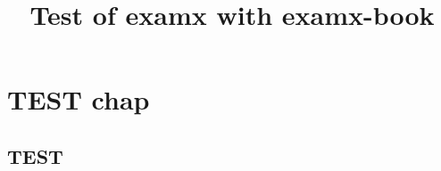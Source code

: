 \documentclass{examx}
\title{Test of examx with examx-book}
\begin{document}
    \examcover
    \tableofcontents
    \chapter{TEST chap}
    \section{TEST}
\end{document}
